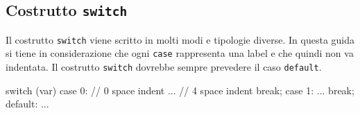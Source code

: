 \subsection{Costrutto \texttt{switch}}

Il costrutto \texttt{switch} viene scritto in molti modi e tipologie diverse.
In questa guida si tiene in considerazione che ogni \texttt{case} rappresenta una label e che quindi non va indentata.
Il costrutto \texttt{switch} dovrebbe sempre prevedere il caso \texttt{default}.

\begin{minipage}[t]{\rbwidth}
\begin{RightCode}
switch (var)
{
case 0:   // 0 space indent
    ...   // 4 space indent
    break;
case 1:
    ...
    break;
default:
    ...
}
\end{RightCode}
\end{minipage}%